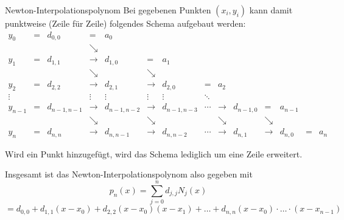 \begin{defi}{Newton-Interpolationspolynom}
    Bei gegebenen Punkten $(x_i, y_i)$ kann damit punktweise (Zeile für Zeile) folgendes Schema aufgebaut werden:
    \[
        \begin{array}{cccccccccccccc}
            y_0     & = & d_{0,0}      & =           & a_0                                                                                                              \\
                    &   &              & \searrow                                                                                                                       \\
            y_1     & = & d_{1,1}      & \rightarrow & d_{1,0}      & =           & a_1                                                                                 \\
                    &   &              & \searrow    &              & \searrow                                                                                          \\
            y_2     & = & d_{2,2}      & \rightarrow & d_{2,1}      & \rightarrow & d_{2,0}      & =      & a_2                                                         \\
            \vdots  &   &              & \vdots      & \vdots       & \vdots      & \vdots       & \ddots                                                               \\
            y_{n-1} & = & d_{n-1, n-1} & \rightarrow & d_{n-1, n-2} & \rightarrow & d_{n-1, n-3} & \cdots & \rightarrow & d_{n-1, 0} & =           & a_{n-1}            \\
                    &   &              & \searrow    &              & \searrow    &              &        & \searrow    &            & \searrow                         \\
            y_n     & = & d_{n,n}      & \rightarrow & d_{n, n-1}   & \rightarrow & d_{n, n-2}   & \cdots & \rightarrow & d_{n, 1}   & \rightarrow & d_{n, 0} & = & a_n
        \end{array}
    \]
    
    Wird ein Punkt hinzugefügt, wird das Schema lediglich um eine Zeile erweitert.
    
    Insgesamt ist das Newton-Interpolationspolynom also gegeben mit 
    \[ 
        p_n(x) = \sum_{j=0}^{n} d_{j,j} N_j(x)  
    \]
    \[  
        = d_{0, 0} + d_{1, 1} (x - x_0) + d_{2, 2} (x - x_0) (x - x_1) + \ldots + d_{n, n} (x - x_0) \cdot \ldots \cdot (x - x_{n-1})
    \]
\end{defi}

